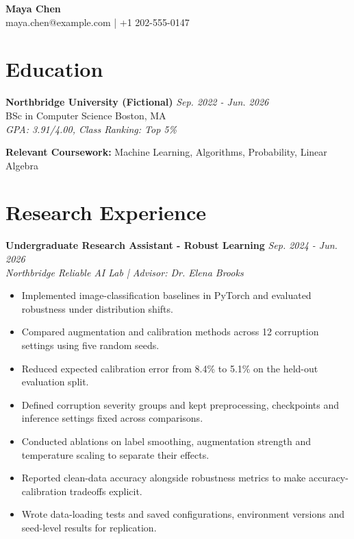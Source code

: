 \documentclass[11pt,a4paper]{article}
\begin{document}
\begin{center}
{\Huge\bfseries Maya Chen}\\[6pt]
{\small maya.chen@example.com \quad | \quad +1 202-555-0147}
\end{center}
\section{Education}
\textbf{Northbridge University (Fictional)} \hfill \textit{Sep. 2022 - Jun. 2026}\\
BSc in Computer Science \hfill Boston, MA\\
\textit{GPA: 3.91/4.00, Class Ranking: Top 5\%}

\textbf{Relevant Coursework:} Machine Learning, Algorithms, Probability, Linear Algebra
\vspace{4pt}

\section{Research Experience}
\textbf{Undergraduate Research Assistant - Robust Learning} \hfill \textit{Sep. 2024 - Jun. 2026}\\
\textit{Northbridge Reliable AI Lab | Advisor: Dr. Elena Brooks}
\begin{itemize}[leftmargin=*,noitemsep,topsep=2pt]
\item Implemented image-classification baselines in PyTorch and evaluated robustness under distribution shifts.
\item Compared augmentation and calibration methods across 12 corruption settings using five random seeds.
\item Reduced expected calibration error from 8.4\% to 5.1\% on the held-out evaluation split.
\item Defined corruption severity groups and kept preprocessing, checkpoints and inference settings fixed across comparisons.
\item Conducted ablations on label smoothing, augmentation strength and temperature scaling to separate their effects.
\item Reported clean-data accuracy alongside robustness metrics to make accuracy-calibration tradeoffs explicit.
\item Wrote data-loading tests and saved configurations, environment versions and seed-level results for replication.
\end{itemize}
\end{document}
